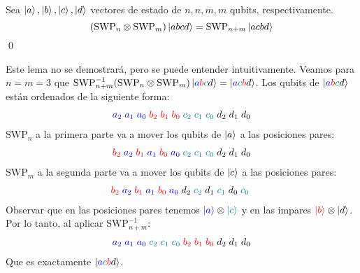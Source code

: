 \begin{lema}\label{lem:swap}
Sea $\ket{a}, \ket{b}, \ket{c}, \ket{d}$ vectores de estado de $n, n, m, m$ qubits, respectivamente.
    \[(\text{SWP}_{n}\otimes \text{SWP}_{m}) \ket{abcd} = \text{SWP}_{n+m} \ket{acbd}\] \qed
\end{lema}
\begin{ejemplo}
    Este lema no se demostrará, pero se puede entender intuitivamente. Veamos para $n=m=3$ que $\text{SWP}_{n+m}^{-1} (\text{SWP}_{n}\otimes \text{SWP}_{m}) \ket{\textcolor{blue}{a}\textcolor{red}{b}\textcolor{teal}{c}\textcolor{black}{d}} = \ket{\textcolor{blue}{a}\textcolor{teal}{c}\textcolor{red}{b}\textcolor{black}{d}}$. Los qubits de $\ket{\textcolor{blue}{a}\textcolor{red}{b}\textcolor{teal}{c}\textcolor{black}{d}}$ están ordenados de la siguiente forma:
    \begin{align*}
        \textcolor{blue}{a_2\;a_1\;a_0}\;\textcolor{red}{b_2\;b_1\;b_0}\;\textcolor{teal}{c_2\;c_1\;c_0}\;\textcolor{black}{d_2\;d_1\;d_0}
    \end{align*}
    $\text{SWP}_n$ a la primera parte va a mover los qubits de \textcolor{blue}{$\ket{a}$} a las posiciones pares:
    \begin{align*}
        \textcolor{red}{b_2}\;\textcolor{blue}{a_2}\;\textcolor{red}{b_1}\;\textcolor{blue}{a_1}\;\textcolor{red}{b_0}\;\textcolor{blue}{a_0}\;\textcolor{teal}{c_2\;c_1\;c_0}\;\textcolor{black}{d_2\;d_1\;d_0}
    \end{align*}
    $\text{SWP}_m$ a la segunda parte va a mover los qubits de \textcolor{teal}{$\ket{c}$} a las posiciones pares:
    \begin{align*}
        \textcolor{red}{b_2}\;\textcolor{blue}{a_2}\;\textcolor{red}{b_1}\;\textcolor{blue}{a_1}\;\textcolor{red}{b_0}\;\textcolor{blue}{a_0}\;\textcolor{black}{d_2}\;\textcolor{teal}{c_2}\;\textcolor{black}{d_1}\;\textcolor{teal}{c_1}\;\textcolor{black}{d_0}\;\textcolor{teal}{c_0}\;
    \end{align*}
    Observar que en las posiciones pares tenemos $\textcolor{blue}{\ket{a}}\otimes\textcolor{teal}{\ket{c}}$ y en las impares $\textcolor{red}{\ket{b}}\otimes\textcolor{black}{\ket{d}}$. Por lo tanto, al aplicar $\text{SWP}_{n+m}^{-1}$:
    \begin{align*}
        \textcolor{blue}{a_2\;a_1\;a_0}\;\textcolor{teal}{c_2\;c_1\;c_0}\;\textcolor{red}{b_2\;b_1\;b_0}\;\textcolor{black}{d_2\;d_1\;d_0}
    \end{align*}
    Que es exactamente $\ket{\textcolor{blue}{a}\textcolor{teal}{c}\textcolor{red}{b}\textcolor{black}{d}}$.
\end{ejemplo}


